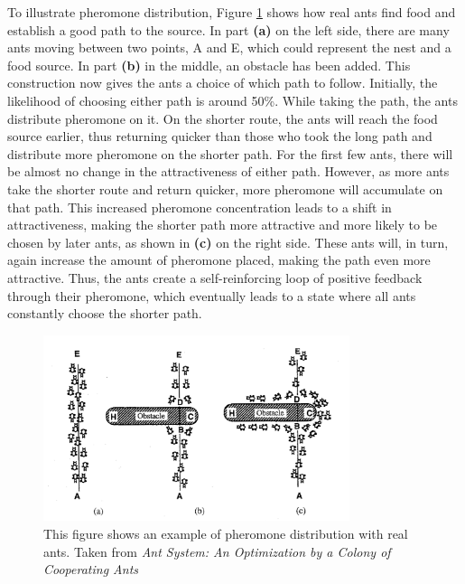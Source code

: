 To illustrate pheromone distribution, Figure \ref{fig:antSystemExampleIllustration} shows how real ants find food and establish a good path to the source. 
In part \textbf{(a)} on the left side, there are many ants moving between two points, A and E, which could represent the nest and a food source.
In part \textbf{(b)} in the middle, an obstacle has been added.
This construction now gives the ants a choice of which path to follow. 
Initially, the likelihood of choosing either path is around 50\%.
While taking the path, the ants distribute pheromone on it. 
On the shorter route, the ants will reach the food source earlier, thus returning quicker than those who took the long path and distribute more pheromone on the shorter path.
For the first few ants, there will be almost no change in the attractiveness of either path.
However, as more ants take the shorter route and return quicker, more pheromone will accumulate on that path.
This increased pheromone concentration leads to a shift in attractiveness, making the shorter path more attractive and more likely to be chosen by later ants, as shown in \textbf{(c)} on the right side.
These ants will, in turn, again increase the amount of pheromone placed, making the path even more attractive.
Thus, the ants create a self-reinforcing loop of positive feedback through their pheromone, which eventually leads to a state where all ants constantly choose the shorter path.


\begin{figure}
	\begin{centering}
		\includegraphics[width=0.8\textwidth]{bilder/antSystemExampleIllustration.png}
		\caption{This figure shows an example of pheromone distribution with real ants. Taken from \textit{Ant System: An Optimization by a Colony of Cooperating Ants} \cite{dorigo_ant_1996}}
		\label{fig:antSystemExampleIllustration}
	\end{centering}
\end{figure}


